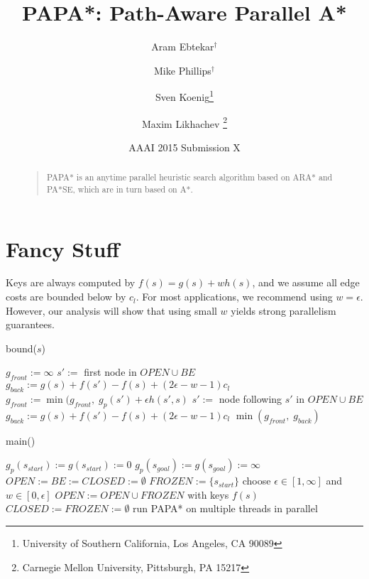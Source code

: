 \documentclass[letterpaper]{article}
\begin{document}
%
\title{PAPA*: Path-Aware Parallel A*}
\author{Aram Ebtekar$^\dagger$ \and Mike Phillips$^\dagger$ \and Sven Koenig\thanks{University of Southern California, Los Angeles, CA 90089} \and Maxim Likhachev%
\thanks{Carnegie Mellon University, Pittsburgh, PA 15217}%
%
}
\author{AAAI 2015 Submission X}%
\maketitle
\begin{abstract}
\begin{quote}
PAPA* is an anytime parallel heuristic search algorithm based on ARA* and PA*SE, which are in turn based on A*.
\end{quote}
\end{abstract}

\section{Fancy Stuff}

Keys are always computed by $f(s) = g(s) + wh(s)$, and we assume all edge costs are bounded below by $c_l$. For most applications, we recommend using $w = \epsilon$. However, our analysis will show that using small $w$ yields strong parallelism guarantees.

\begin{algorithm}
\caption{bound($s$)}
\label{alg:bound}
\begin{algorithmic}
\STATE $g_{front} := \infty$
\STATE $s' :=$ first node in $OPEN \cup BE$
\STATE $g_{back} := g(s) + f(s') - f(s) + (2\epsilon-w-1) c_l$
\STATE $g_{front} := \min(g_{front},\;g_p(s') + \epsilon h(s',s)$
\STATE $s' :=$ node following $s'$ in $OPEN \cup BE$
\STATE $g_{back} := g(s) + f(s') - f(s) + (2\epsilon-w-1) c_l$
\ENDWHILE
\RETURN $\min(g_{front},\;g_{back})$
\end{algorithmic}
\end{algorithm}

\begin{algorithm}
\caption{main()}
\label{alg:main}
\begin{algorithmic}
\STATE $g_p(s_{start}) := g(s_{start}) := 0$
\STATE $g_p(s_{goal}) := g(s_{goal}) := \infty$
\STATE $OPEN := BE := CLOSED := \emptyset$
\STATE $FROZEN := \{s_{start}\}$
\REPEAT
\STATE choose $\epsilon \in [1,\infty]$ and $w \in [0,\epsilon]$
\STATE $OPEN := OPEN \cup FROZEN$ with keys $f(s)$
\STATE $CLOSED := FROZEN := \emptyset$
\STATE run PAPA* on multiple threads in parallel
\end{algorithmic}
\end{algorithm}
\end{document}
